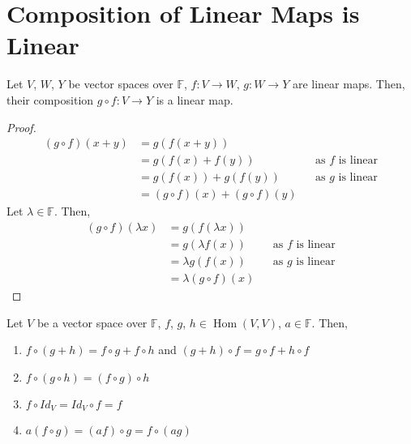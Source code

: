 \documentclass[letterpaper,12pt]{article}
\begin{document}
\section*{Composition of Linear Maps is Linear}
\begin{theorem}
Let $V$, $W$, $Y$ be vector spaces over $\mathbb{F}$, $f: V \rightarrow W$, $g: W \rightarrow Y$ are linear maps. Then, their composition $g \circ f: V \rightarrow Y$ is a linear map.
\end{theorem}
\begin{proof}
\begin{align*}
    (g \circ f)(x + y) & = g(f(x + y)) \\
    & = g(f(x) + f(y)) && \text{as $f$ is linear} \\
    & = g(f(x)) + g(f(y)) && \text{as $g$ is linear} \\
    & = (g \circ f)(x) + (g \circ f)(y)
\end{align*}
Let $\lambda \in \mathbb{F}$. Then,
\begin{align*}
    (g \circ f)(\lambda x) & = g(f(\lambda x)) \\
    & = g(\lambda f(x)) && \text{as $f$ is linear} \\
    & = \lambda g(f(x)) && \text{as $g$ is linear} \\
    & = \lambda (g \circ f)(x)
\end{align*}
\end{proof}

\begin{theorem}
Let $V$ be a vector space over $\mathbb{F}$, $f$, $g$, $h \in \operatorname{Hom}(V,V)$, $a \in \mathbb{F}$. Then,
\begin{enumerate}
    \item $f \circ (g + h) = f \circ g + f \circ h$ and $(g + h) \circ f = g \circ f + h \circ f$
    \item $f \circ (g \circ h) = (f \circ g) \circ h$
    \item $f \circ Id_{V} = Id_{V} \circ f = f$
    \item $a(f \circ g) = (af) \circ g = f \circ (ag)$
\end{enumerate}
\end{theorem}
\end{document}
